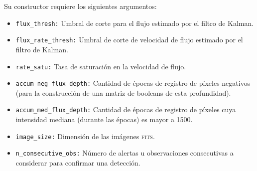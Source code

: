 Su constructor requiere los siguientes argumentos:
\begin{itemize}
\item \texttt{flux\_thresh:} Umbral de corte para el flujo estimado por el filtro de Kalman.
\item \texttt{flux\_rate\_thresh:} Umbral de corte de velocidad de flujo estimado por el filtro de Kalman.
\item \texttt{rate\_satu:} Tasa de saturaci\'on en la velocidad de flujo.
\item \texttt{accum\_neg\_flux\_depth:} Cantidad de \'epocas de registro de p\'ixeles negativos (para la construcci\'on de una matriz de booleans de esta profundidad).
\item \texttt{accum\_med\_flux\_depth:} Cantidad de \'epocas de registro de p\'ixeles cuya intensidad mediana (durante las \'epocas) es mayor a 1500.
\item \texttt{image\_size:} Dimensi\'on de las im\'agenes \textsc{fits}.
\item \texttt{n\_consecutive\_obs:} N\'umero de alertas u observaciones consecutivas a considerar para confirmar una detecci\'on.

\end{itemize}
